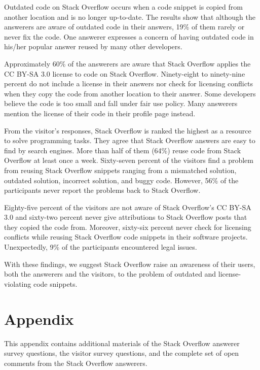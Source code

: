 \documentclass{svjour3}                     %
\begin{document}
Outdated code on Stack Overflow occurs when a code snippet is
copied from another location and is no longer up-to-date. The results show that
although the answerers are aware of outdated code in their answers, 19\% of them
rarely or never fix the code. One answerer expresses a concern of having
outdated code in his/her popular answer reused
by many other developers.

Approximately 60\% of the answerers are aware that Stack Overflow
applies the CC BY-SA 3.0
license to code on Stack Overflow. Ninety-eight to ninety-nine percent
do not include a license in their answers nor check for licensing conflicts when
they copy the code from another location to their answer. Some developers
believe the code is too small and fall under fair use policy. Many answerers
mention the license of their code in their profile page instead.

From the visitor's responses, Stack Overflow is ranked the highest as a resource
to solve programming tasks. They agree that Stack Overflow answers are easy to
find by search engines. More than half of them (64\%) reuse code from Stack
Overflow at least once a week. Sixty-seven percent of the visitors find a
problem from reusing Stack Overflow snippets ranging from a mismatched solution,
outdated solution, incorrect solution, and buggy code. However, 56\% of the
participants never report the problems back to Stack Overflow.

Eighty-five percent of the visitors are not aware of Stack Overflow's CC BY-SA
3.0 and sixty-two percent never give attributions to Stack Overflow posts that they copied
the code from. Moreover, sixty-six percent never check for licensing conflicts while
reusing Stack Overflow code snippets in their software
projects. Unexpectedly, 9\%
of the participants encountered legal issues.

With these findings, we
suggest Stack Overflow raise an awareness of their users, both the answerers and
the visitors, to the problem of outdated and license-violating code snippets.


%
%

 

\clearpage
\section{Appendix}

This appendix contains additional materials of the Stack Overflow answerer
survey questions, the visitor survey questions, and the complete set of open
comments from the Stack Overflow answerers.
\end{document}
